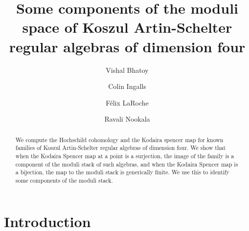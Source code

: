 \documentclass{amsart}
\title[Koszul Artin Schelter-Regular Algebras of Dimension four]{Some components of the moduli space of Koszul Artin-Schelter regular algebras of dimension four}
\author{Vishal Bhatoy}
\author{Colin Ingalls}
\author{F\'elix LaRoche}
\author{Ravali Nookala}
\begin{document}
\begin{abstract}

    We compute the Hochschild cohomology and the Kodaira spencer map for known families of Koszul Artin-Schelter regular algebras of dimension four.  We show that when the Kodaira Spencer map at a point is a surjection, the image of the family is a component of the moduli stack of such algebras, and when the Kodaira Spencer map is a bijection, the map to the moduli stack is generically finite. We use this to identify some components of the moduli stack.
\end{abstract}
\maketitle
\newtheorem{theorem}{Theorem}[section]  %
\newtheorem{lemma}[theorem]{Lemma}       %
\newtheorem{proposition}[theorem]{Proposition}  %
\newtheorem{corollary}[theorem]{Corollary}      %
\theoremstyle{definition}
\newtheorem{definition}[theorem]{Definition}    %
\newtheorem{remark}[theorem]{Remark}            %
\newtheorem{example}[theorem]{Example}           %
\newtheorem{question}[theorem]{Question}         %
\newtheorem{custom_def}[theorem]{} 
\newtheorem*{mainthm}{Theorem}
\newcommand{\BigOplus}{\mathop{\scalebox{1.3}{$\bigoplus$}}}


\section{Introduction}
\end{document}
